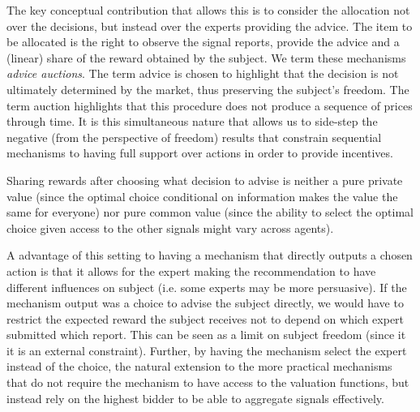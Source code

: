 


The key conceptual contribution that allows this is to consider the allocation not over the decisions, but instead over the experts providing the advice. 
The item to be allocated is the right to observe the signal reports, provide the advice and a (linear) share of the reward obtained by the subject.
We term these mechanisms \emph{advice auctions}.
The term advice is chosen to highlight that the decision is not ultimately determined by the market, thus preserving the subject's freedom.
The term auction highlights that this procedure does not produce a sequence of prices through time.
It is this simultaneous nature that allows us to side-step the negative (from the perspective of freedom) results that constrain sequential mechanisms to having full support over actions in order to provide  incentives.

Sharing rewards after choosing what decision to advise is neither a pure private value (since the optimal choice conditional on information makes the value the same for everyone) nor pure common value (since the ability to select the optimal choice given access to the other signals might vary across agents).

A advantage of this setting to having a mechanism that directly outputs a chosen action is that it allows for the expert making the recommendation to have different influences on subject (i.e. some experts may be more persuasive).
If the mechanism output was a choice to advise the subject directly, we would have to restrict the expected reward the subject receives not to depend on which expert submitted which report. This can be seen as  a limit on subject freedom (since it it is an external constraint).
Further, by having the mechanism select the expert instead of the choice, the natural extension to the more practical mechanisms that do not require the mechanism to have access to the valuation functions, but instead rely on the highest bidder to be able to aggregate signals effectively.



